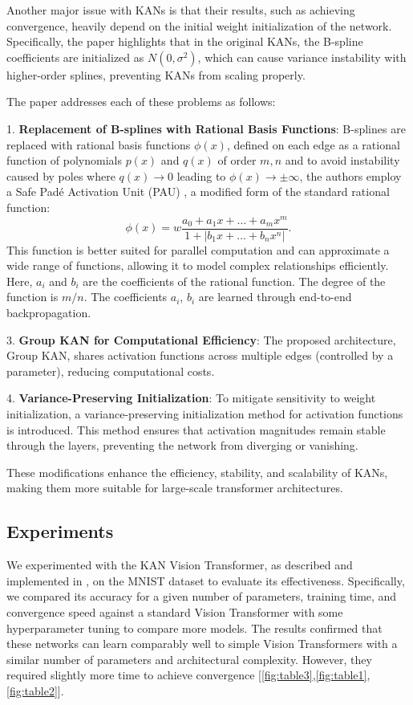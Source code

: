 \documentclass[conference]{IEEEtran}
\begin{document}
Another major issue with KANs is that their results, such as achieving
convergence, heavily depend on the initial weight initialization of the
network. Specifically, the paper highlights that in the original KANs, the
B-spline coefficients are initialized as \( N(0, \sigma^2) \), which can cause
variance instability with higher-order splines, preventing KANs from scaling
properly.

The paper addresses each of these problems as follows:

1. \textbf{Replacement of B-splines with Rational Basis Functions}: B-splines are replaced with rational basis functions \( \phi(x) \), defined on each edge as a rational function of polynomials \( p(x) \) and \( q(x) \) of order \( m, n \) and to avoid instability caused by poles where \( q(x) \to 0 \) leading to \( \phi(x) \to \pm\infty \), the authors employ a Safe Padé Activation Unit (PAU) \cite{MSK20}, a modified form of the standard rational function:
\begin{equation}
    \phi(x) = w\frac{a_0 + a_1x + \dots + a_m x^m}{1 + |b_1x + \dots + b_n x^n|}.
\end{equation}
This function is better suited for parallel computation and can approximate a wide range of functions, allowing it to model complex relationships efficiently.
Here, \( a_i \) and \( b_i \) are the coefficients of the rational function. The degree of the function is \( m/n \). The coefficients \( a_i \), \( b_i \) are learned through end-to-end backpropagation.

3. \textbf{Group KAN for Computational Efficiency}: The proposed architecture, Group KAN, shares activation functions across multiple edges (controlled by a parameter), reducing computational costs.

4. \textbf{Variance-Preserving Initialization}: To mitigate sensitivity to weight initialization, a variance-preserving initialization method for activation functions is introduced. This method ensures that activation magnitudes remain stable through the layers, preventing the network from diverging or vanishing.

These modifications enhance the efficiency, stability, and scalability of KANs,
making them more suitable for large-scale transformer architectures.

\subsection{Experiments}
We experimented with the KAN Vision Transformer, as described and implemented
in \cite{kat}, on the MNIST dataset to evaluate its effectiveness.
Specifically, we compared its accuracy for a given number of parameters,
training time, and convergence speed against a standard Vision Transformer with
some hyperparameter tuning to compare more models. The results confirmed that
these networks can learn comparably well to simple Vision Transformers with a
similar number of parameters and architectural complexity. However, they
required slightly more time to achieve convergence
    [\ref{fig:table3},\ref{fig:table1},\ref{fig:table2}].
\end{document}
